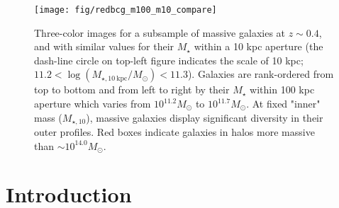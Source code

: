 \documentclass{emulateapj}
\def\mstar{{$M_{\star}$}}
\begin{document}
\begin{CJK*}{UTF8}{gbsn}
  \begin{figure}[t!]
      \centering 
      \texttt{[image: fig/redbcg\_m100\_m10\_compare]}
      \caption{
          Three-color images for a subsample of massive galaxies at $z\sim 0.4$, and 
          with similar values for their \mstar{} within a 10 kpc aperture 
          (the dash-line circle on top-left figure indicates the scale of 10 kpc;
          $11.2<\log (M_{\star,10\ \mathrm{kpc}}/M_{\odot})<11.3$). 
          Galaxies are rank-ordered from top to bottom and from left to right by 
          their \mstar{} within 100 kpc aperture which varies from $10^{11.2} M_{\odot}$ 
          to $10^{11.7} M_{\odot}$. 
          At fixed "inner" mass ($M_{\star,10}$), massive galaxies display significant
          diversity in their outer profiles. 
          Red boxes indicate galaxies in halos more massive than 
          $\sim 10^{14.0} M_{\odot}$. 
          }
      \label{fig:m100_m10_color}
  \end{figure}

\section{Introduction}
    \label{sec:intro}


\end{CJK*}
\end{document}
